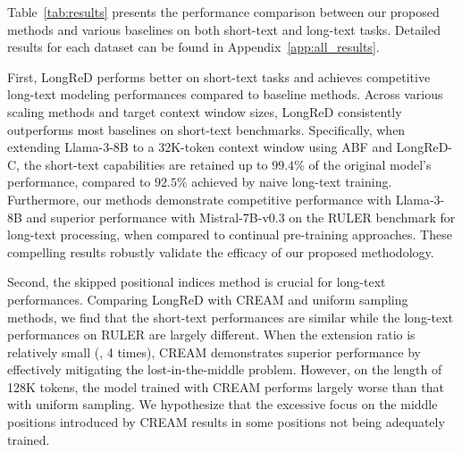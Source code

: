 Table~\ref{tab:results} presents the performance comparison between our proposed methods and various baselines on both short-text and long-text tasks. Detailed results for each dataset can be found in Appendix~\ref{app:all_results}.

First, LongReD performs better on short-text tasks and achieves competitive long-text modeling performances compared to baseline methods. Across various scaling methods and target context window sizes, LongReD consistently outperforms most baselines on short-text benchmarks. Specifically, when extending Llama-3-8B to a 32K-token context window using ABF and LongReD-C, the short-text capabilities are retained up to $99.4\%$ of the original model's performance, compared to $92.5\%$ achieved by naive long-text training.
Furthermore, our methods demonstrate competitive performance with Llama-3-8B and superior performance with Mistral-7B-v0.3 on the RULER benchmark for long-text processing, when compared to continual pre-training approaches. These compelling results robustly validate the efficacy of our proposed methodology.




Second, the skipped positional indices method is crucial for long-text performances. Comparing LongReD with CREAM and uniform sampling methods, we find that the short-text performances are similar while the long-text performances on RULER are largely different. When the extension ratio is relatively small (\eg, 4 times), CREAM demonstrates superior performance by effectively mitigating the lost-in-the-middle problem. However, on the length of 128K tokens, the model trained with CREAM performs largely worse than that with uniform sampling.  We hypothesize that the excessive focus on the middle positions introduced by CREAM results in some positions not being adequately trained.



